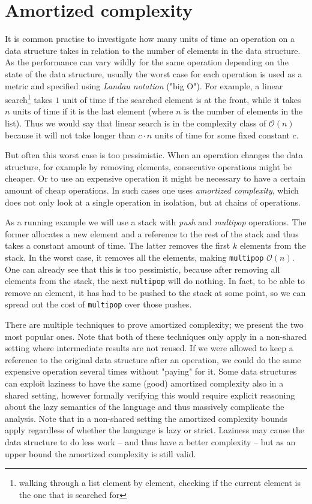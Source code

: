 \documentclass[sigplan,screen]{acmart}
\renewcommand\O[1]{$\mathcal{O}(#1)$}
\begin{document}
\section{Amortized complexity}\label{sec:complexity}

It is common practise to investigate how many units of time an operation on a data structure takes in relation to the number of elements in the data structure. As the performance can vary wildly for the same operation depending on the state of the data structure, usually the worst case for each operation is used as a metric and specified using \textit{Landau notation} ("big O"). For example, a linear search\footnote{walking through a list element by element, checking if the current element is the one that is searched for} takes $1$ unit of time if the searched element is at the front, while it takes $n$ units of time if it is the last element (where $n$ is the number of elements in the list). Thus we would say that linear search is in the complexity class of \O{n} because it will not take longer than $c \cdot n$ units of time for some fixed constant $c$.

But often this worst case is too pessimistic. When an operation changes the data structure, for example by removing elements, consecutive operations might be cheaper. Or to use an expensive operation it might be necessary to have a certain amount of cheap operations. In such cases one uses \textit{amortized complexity}, which does not only look at a single operation in isolation, but at chains of operations.

As a running example we will use a stack with \textit{push} and \textit{multipop} operations. The former allocates a new element and a reference to the rest of the stack and thus takes a constant amount of time. The latter removes the first $k$ elements from the stack. In the worst case, it removes all the elements, making \texttt{multipop} \O{n}. One can already see that this is too pessimistic, because after removing all elements from the stack, the next \texttt{multipop} will do nothing. In fact, to be able to remove an element, it has had to be pushed to the stack at some point, so we can spread out the cost of \texttt{multipop} over those pushes.

There are multiple techniques to prove amortized complexity; we present the two most popular ones. Note that both of these techniques only apply in a non-shared setting where intermediate results are not reused. If we were allowed to keep a reference to the original data structure after an operation, we could do the same expensive operation several times without "paying" for it. Some data structures can exploit laziness to have the same (good) amortized complexity also in a shared setting, however formally verifying this would require explicit reasoning about the lazy semantics of the language and thus massively complicate the analysis. Note that in a non-shared setting the amortized complexity bounds apply regardless of whether the language is lazy or strict. Laziness may cause the data structure to do less work -- and thus have a better complexity -- but as an upper bound the amortized complexity is still valid.
\end{document}
